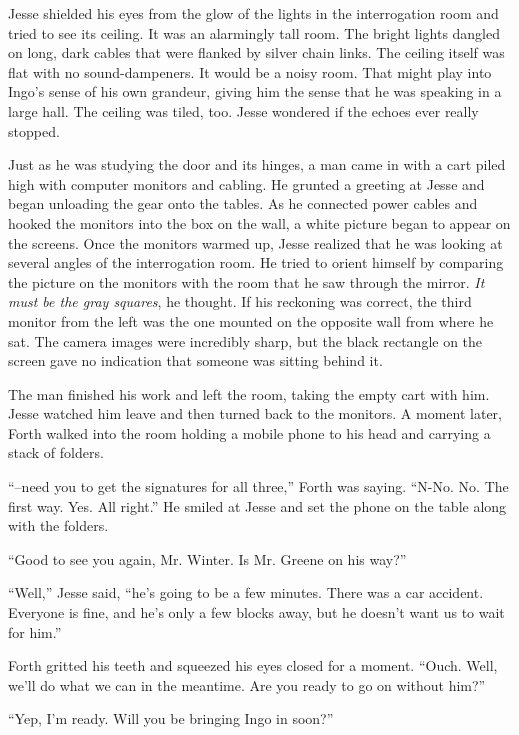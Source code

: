 \documentclass[12pt]{book}
\begin{document}
Jesse shielded his eyes from the glow of the lights in the interrogation room and tried to see its ceiling.  It was an alarmingly tall room.  The bright lights dangled on long, dark cables that were flanked by silver chain links.  The ceiling itself was flat with no sound-dampeners.  It would be a noisy room.  That might play into Ingo's sense of his own grandeur, giving him the sense that he was speaking in a large hall.  The ceiling was tiled, too.  Jesse wondered if the echoes ever really stopped.

Just as he was studying the door and its hinges, a man came in with a cart piled high with computer monitors and cabling.  He grunted a greeting at Jesse and began unloading the gear onto the tables.  As he connected power cables and hooked the monitors into the box on the wall, a white picture began to appear on the screens.  Once the monitors warmed up, Jesse realized that he was looking at several angles of the interrogation room.  He tried to orient himself by comparing the picture on the monitors with the room that he saw through the mirror.  \emph{It must be the gray squares}, he thought.  If his reckoning was correct, the third monitor from the left was the one mounted on the opposite wall from where he sat.  The camera images were incredibly sharp, but the black rectangle on the screen gave no indication that someone was sitting behind it.

The man finished his work and left the room, taking the empty cart with him.  Jesse watched him leave and then turned back to the monitors.  A moment later, Forth walked into the room holding a mobile phone to his head and carrying a stack of folders.

``--need you to get the signatures for all three,'' Forth was saying.  ``N-No.  No.  The first way.  Yes.  All right.''  He smiled at Jesse and set the phone on the table along with the folders.

``Good to see you again, Mr. Winter.  Is Mr. Greene on his way?''

``Well,'' Jesse said, ``he's going to be a few minutes.  There was a car accident.  Everyone is fine, and he's only a few blocks away, but he doesn't want us to wait for him.''

Forth gritted his teeth and squeezed his eyes closed for a moment.  ``Ouch.  Well, we'll do what we can in the meantime.  Are you ready to go on without him?''

``Yep, I'm ready.  Will you be bringing Ingo in soon?''
\end{document}
